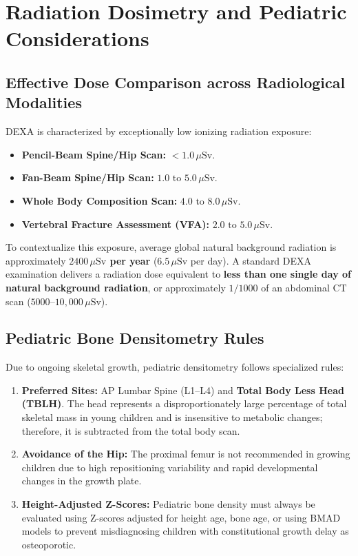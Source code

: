 \documentclass[11pt,a4paper]{article}
\begin{document}
\newpage
\section{Radiation Dosimetry and Pediatric Considerations}

\subsection{Effective Dose Comparison across Radiological Modalities}

DEXA is characterized by exceptionally low ionizing radiation exposure:
\begin{itemize}[leftmargin=*]
    \item \textbf{Pencil-Beam Spine/Hip Scan:} $< 1.0\,\mu\text{Sv}$.
    \item \textbf{Fan-Beam Spine/Hip Scan:} $1.0\text{ to }5.0\,\mu\text{Sv}$.
    \item \textbf{Whole Body Composition Scan:} $4.0\text{ to }8.0\,\mu\text{Sv}$.
    \item \textbf{Vertebral Fracture Assessment (VFA):} $2.0\text{ to }5.0\,\mu\text{Sv}$.
\end{itemize}
To contextualize this exposure, average global natural background radiation is approximately \textbf{$2400\,\mu\text{Sv}$ per year} ($6.5\,\mu\text{Sv}$ per day). A standard DEXA examination delivers a radiation dose equivalent to \textbf{less than one single day of natural background radiation}, or approximately $1/1000$ of an abdominal CT scan ($5000\text{--}10{,}000\,\mu\text{Sv}$).

\subsection{Pediatric Bone Densitometry Rules}

Due to ongoing skeletal growth, pediatric densitometry follows specialized rules:
\begin{enumerate}[leftmargin=*]
    \item \textbf{Preferred Sites:} AP Lumbar Spine (L1--L4) and \textbf{Total Body Less Head (TBLH)}. The head represents a disproportionately large percentage of total skeletal mass in young children and is insensitive to metabolic changes; therefore, it is subtracted from the total body scan.
    \item \textbf{Avoidance of the Hip:} The proximal femur is not recommended in growing children due to high repositioning variability and rapid developmental changes in the growth plate.
    \item \textbf{Height-Adjusted Z-Scores:} Pediatric bone density must always be evaluated using Z-scores adjusted for height age, bone age, or using BMAD models to prevent misdiagnosing children with constitutional growth delay as osteoporotic.
\end{enumerate}
\end{document}
